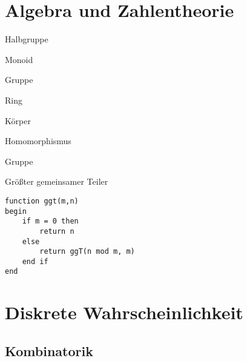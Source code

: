 
\newcommand{\ggT}{\texttt{ggT}}

\chapter{Algebra und Zahlentheorie}
\begin{definition}{Halbgruppe}
	
\end{definition}
\begin{definition}{Monoid}
	
\end{definition}
\begin{definition}{Gruppe}
	
\end{definition}
\begin{definition}{Ring}
	
\end{definition}
\begin{definition}{Körper}
	
\end{definition}
\begin{definition}{Homomorphismus}
	
\end{definition}



\begin{definition}{Gruppe}
	
\end{definition}


Größter gemeinsamer Teiler
\begin{lstlisting}
function ggt(m,n)
begin
	if m = 0 then 
		return n
	else 
		return ggT(n mod m, m)
	end if
end
\end{lstlisting}




\chapter{Diskrete Wahrscheinlichkeit}
\section{Kombinatorik}







